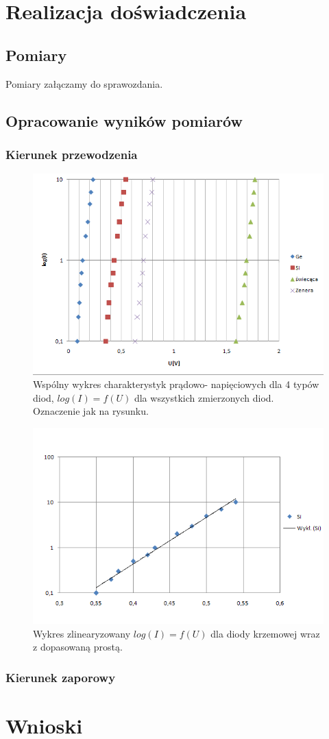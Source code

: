 \documentclass[11pt]{article}
\begin{document}
\section{Realizacja doświadczenia}
\subsection{Pomiary}
Pomiary załączamy do sprawozdania.
\subsection{Opracowanie wyników pomiarów}
\subsubsection{Kierunek przewodzenia}
\begin{figure}[H]
    \centering
    \includegraphics[height=0.27\paperheight]{graph1}
    \caption{ Wspólny  wykres  charakterystyk  prądowo-
napięciowych dla 4 typów diod,  $log(I) = f(U)$  dla  wszystkich  zmierzonych  diod. Oznaczenie jak na rysunku. }
    \label{fig:graph3}
\end{figure}

\begin{figure}[H]
    \centering
    \includegraphics[height=0.27\paperheight]{graph2}
    \caption{ Wykres  zlinearyzowany $ log(I) = f(U)$ dla diody krzemowej wraz z dopasowaną prostą. }
    \label{fig:graph3}
\end{figure}
\subsubsection{Kierunek zaporowy}
\section{Wnioski}
\end{document}
